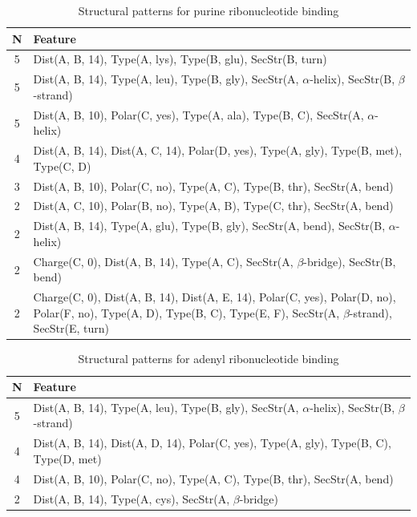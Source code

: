 \documentclass[11pt,twoside,a4paper]{book}
\begin{document}
\begin{table}\begin{tabularx}{\textwidth}{cX}\textbf{N} & \textbf{Feature} \\ \hline  
5 & Dist(A, B, 14),  Type(A, lys), Type(B, glu), SecStr(B, turn)\\ \hline 
5 & Dist(A, B, 14),  Type(A, leu), Type(B, gly), SecStr(A, $\alpha$-helix), SecStr(B, $\beta$-strand)\\ \hline 
5 & Dist(A, B, 10), Polar(C, yes),  Type(A, ala), Type(B, C), SecStr(A, $\alpha$-helix)\\ \hline 
4 & Dist(A, B, 14), Dist(A, C, 14), Polar(D, yes),  Type(A, gly), Type(B, met), \newline Type(C, D)\\ \hline 
3 & Dist(A, B, 10), Polar(C, no),  Type(A, C), Type(B, thr), SecStr(A, bend)\\ \hline 
2 & Dist(A, C, 10), Polar(B, no),  Type(A, B), Type(C, thr), SecStr(A, bend)\\ \hline 
2 & Dist(A, B, 14),  Type(A, glu), Type(B, gly), SecStr(A, bend), SecStr(B, $\alpha$-helix)\\ \hline 
2 & Charge(C, 0), Dist(A, B, 14),  Type(A, C), SecStr(A, $\beta$-bridge), SecStr(B, bend)\\ \hline 
2 & Charge(C, 0), Dist(A, B, 14), Dist(A, E, 14), Polar(C, yes), Polar(D, no), \newline Polar(F, no),  Type(A, D), Type(B, C), Type(E, F), SecStr(A, $\beta$-strand), \newline SecStr(E, turn)\\ \hline 
 \end{tabularx}\caption{Structural patterns for purine ribonucleotide binding}\label{tab:purine_ribonucleotide_binding}\end{table}
\begin{table}\begin{tabularx}{\textwidth}{cX}\textbf{N} & \textbf{Feature} \\ \hline  
5 & Dist(A, B, 14),  Type(A, leu), Type(B, gly), SecStr(A, $\alpha$-helix), SecStr(B, $\beta$-strand)\\ \hline 
4 & Dist(A, B, 14), Dist(A, D, 14), Polar(C, yes),  Type(A, gly), Type(B, C), \newline Type(D, met)\\ \hline 
4 & Dist(A, B, 10), Polar(C, no),  Type(A, C), Type(B, thr), SecStr(A, bend)\\ \hline 
2 & Dist(A, B, 14),   Type(A, cys), SecStr(A, $\beta$-bridge)\\ \hline 
 \end{tabularx}\caption{Structural patterns for adenyl ribonucleotide binding}\label{tab:adenyl_ribonucleotide_binding}\end{table}
\end{document}
